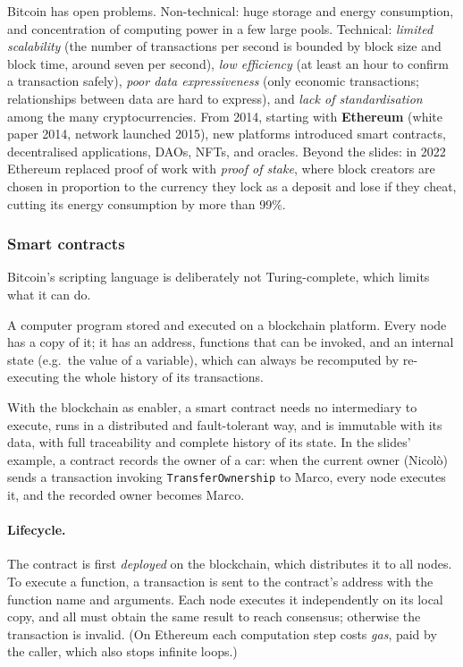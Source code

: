Bitcoin has open problems. Non-technical: huge storage and energy consumption, and concentration of computing power in a few large pools. Technical: \emph{limited scalability} (the number of transactions per second is bounded by block size and block time, around seven per second), \emph{low efficiency} (at least an hour to confirm a transaction safely), \emph{poor data expressiveness} (only economic transactions; relationships between data are hard to express), and \emph{lack of standardisation} among the many cryptocurrencies. From 2014, starting with \textbf{Ethereum} (white paper 2014, network launched 2015), new platforms introduced smart contracts, decentralised applications, DAOs, NFTs, and oracles. Beyond the slides: in 2022 Ethereum replaced proof of work with \emph{proof of stake}, where block creators are chosen in proportion to the currency they lock as a deposit and lose if they cheat, cutting its energy consumption by more than 99\%.

\subsubsection{Smart contracts}

Bitcoin's scripting language is deliberately not Turing-complete, which limits what it can do.

\begin{definition}
A computer program stored and executed on a blockchain platform. Every node has a copy of it; it has an address, functions that can be invoked, and an internal state (e.g.\ the value of a variable), which can always be recomputed by re-executing the whole history of its transactions.
\end{definition}

With the blockchain as enabler, a smart contract needs no intermediary to execute, runs in a distributed and fault-tolerant way, and is immutable with its data, with full traceability and complete history of its state. In the slides' example, a contract records the owner of a car: when the current owner (Nicolò) sends a transaction invoking \texttt{TransferOwnership} to Marco, every node executes it, and the recorded owner becomes Marco.

\paragraph{Lifecycle.} The contract is first \emph{deployed} on the blockchain, which distributes it to all nodes. To execute a function, a transaction is sent to the contract's address with the function name and arguments. Each node executes it independently on its local copy, and all must obtain the same result to reach consensus; otherwise the transaction is invalid. (On Ethereum each computation step costs \emph{gas}, paid by the caller, which also stops infinite loops.)

